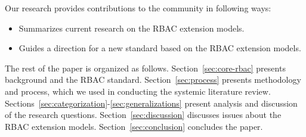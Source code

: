Our research provides contributions to the community in following ways:

\begin{itemize}
\setlength{\itemsep}{0.25pt}
\item Summarizes current research on the RBAC extension models.
\item Guides a direction for a new standard based on the RBAC extension models.
\end{itemize}

The rest of the paper is organized as follows. 
Section~\ref{sec:core-rbac} presents background and the RBAC standard. 
Section~\ref{sec:process} presents methodology and process, which we used in conducting the systemic literature review. 
Sections~\ref{sec:categorization}-\ref{sec:generalizations} present analysis and discussion of the research questions. 
Section~\ref{sec:discussion} discusses issues about the RBAC extension models.
Section~\ref{sec:conclusion} concludes the paper.
